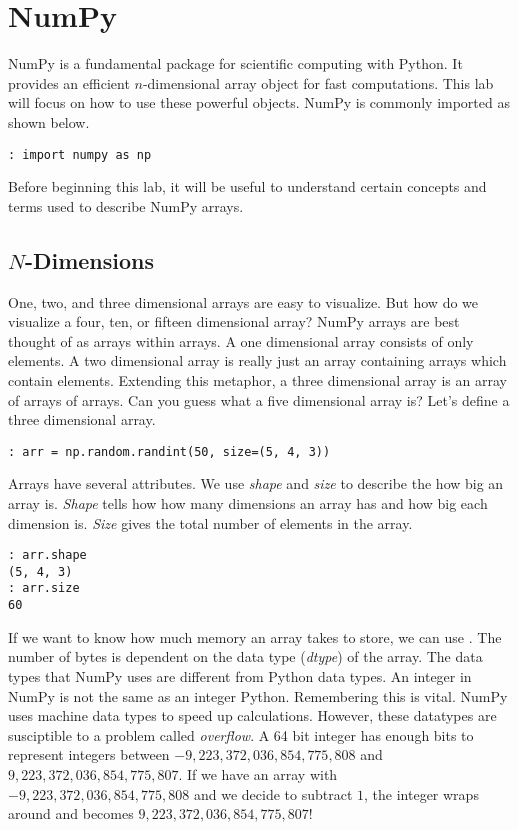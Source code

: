 \section*{NumPy}
NumPy is a fundamental package for scientific computing with Python.  It provides an efficient $n$-dimensional array object for fast computations.  This lab will focus on how to use these powerful objects.  NumPy is commonly imported as shown below.

\begin{lstlisting}
: import numpy as np
\end{lstlisting}
Before beginning this lab, it will be useful to understand certain concepts and terms used to describe NumPy arrays.

\subsection*{$N$-Dimensions}
One, two, and three dimensional arrays are easy to visualize.  But how do we visualize a four, ten, or fifteen dimensional array?  NumPy arrays are best thought of as arrays within arrays.  A one dimensional array consists of only elements.  A two dimensional array is really just an array containing arrays which contain elements.  Extending this metaphor, a three dimensional array is an array of arrays of arrays.  Can you guess what a five dimensional array is?  Let's define a three dimensional array.

\begin{lstlisting}
: arr = np.random.randint(50, size=(5, 4, 3))
\end{lstlisting}

Arrays have several attributes.  We use \emph{shape} and \emph{size} to describe the how big an array is.  \emph{Shape} tells how how many dimensions an array has and how big each dimension is.  \emph{Size} gives the total number of elements in the array.

\begin{lstlisting}
: arr.shape
(5, 4, 3)
: arr.size
60
\end{lstlisting}

If we want to know how much memory an array takes to store, we can use .  The number of bytes is dependent on the data type (\emph{dtype}) of the array.  The data types that NumPy uses are different from Python data types.  An integer in NumPy is not the same as an integer Python.  Remembering this is vital.  NumPy uses machine data types to speed up calculations.  However, these datatypes are susciptible to a problem called \emph{overflow}.  A 64 bit integer has enough bits to represent integers between $-9,223,372,036,854,775,808$ and $9,223,372,036,854,775,807$.  If we have an array with $-9,223,372,036,854,775,808$ and we decide to subtract $1$, the integer wraps around and becomes $9,223,372,036,854,775,807$!  

